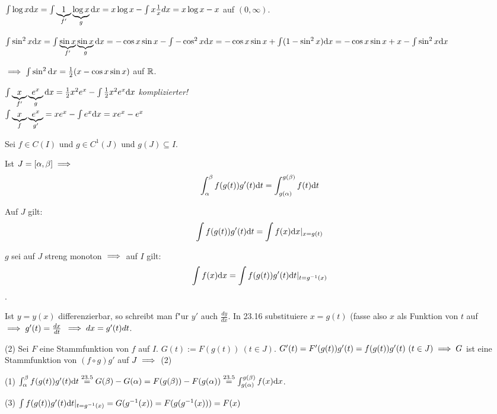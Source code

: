 \documentclass[a4paper,twoside,DIV15,BCOR12mm]{scrbook}
\begin{document}
\begin{beispiele}
\item $\int \log x\text{d}x=\int\underbrace{1}_{f'}\underbrace{\log x}_{g}\text{d}x=x\log x-\int x\frac{1}{x}dx=x\log x - x$ auf $(0, \infty)$.
\item $\int \sin^2 x\text{d}x = \int\underbrace{\sin x}_{f'}\underbrace{\sin x}_{g}\text{d}x = -\cos x\sin x - \int{-\cos^2 x\text{d}x}=-\cos x\sin x + \int(1-\sin^2 x)\text{d}x=-\cos x\sin x + x-\int\sin^2 x\text{d}x$

$\implies \int\sin^2\text{d}x =\frac{1}{2}(x-\cos x \sin x)$ auf $\mathbb{R}$.
\item $\int \underbrace{x}_{f'}\underbrace{e^x}_{g}\text{d}x=\frac{1}{2}x^2e^x-\int\frac{1}{2}x^2e^x\text{d}x$ \emph{komplizierter!}\\
$\int\underbrace{x}_{f}\underbrace{e^x}_{g'}=xe^x-\int{e^x\text{d}x}=xe^x-e^x$
\end{beispiele}

\begin{satz}[Substitutionsregeln]
Sei $f\in C(I)$ und $g \in C^1(J)$ und $g(J)\subseteq I$.
\begin{liste}
\item Ist $J=[\alpha, \beta]\implies$ $$\int_{\alpha}^{\beta}f(g(t))g'(t)\text{d}t=\int_{g(\alpha)}^{g(\beta)}f(t)\text{d}t$$
\item Auf $J$ gilt: $$\int f(g(t))g'(t)\text{d}t=\int f(x)\text{d}x|_{x=g(t)}$$
\item $g$ sei auf $J$ streng monoton $\implies$ auf $I$ gilt: $$\int f(x)\text{d}x=\int f(g(t))g'(t)\text{d}t|_{t=g^{-1}(x)}$$.
\end{liste}
\end{satz}

\begin{merkregel}
Ist $y=y(x)$ differenzierbar, so schreibt man f"ur $y'$ auch $\frac{dy}{dx}$. In 23.16 substituiere $x=g(t)$ (fasse also $x$ als Funktion von $t$ auf $\implies g'(t)=\frac{dx}{dt}$ \glqq$\implies dx=g'(t)dt$\grqq.
\end{merkregel}

\begin{beweise}
\item[(2)]
Sei $F$ eine Stammfunktion von $f$ auf $I$. $G(t):=F(g(t))\ (t\in J)$. $G'(t)=F'(g(t))g'(t)=f(g(t))g'(t)\ (t\in J)\implies G$ ist eine Stammfunktion von $(f\circ g)g'$ auf $J \implies$ (2)
\item[(1)]$\int_{\alpha}^{\beta}f(g(t))g'(t)\text{d}t\overset{23.5}{=}G(\beta)-G(\alpha)=F(g(\beta))-F(g(\alpha))\overset{23.5}{=}\int_{g(\alpha)}^{g(\beta)}f(x)\text{d}x$.
\item[(3)]$\int f(g(t))g'(t)\text{d}t|_{t=g^{-1}(x)}=G(g^{-1}(x))=F(g(g^{-1}(x)))=F(x)$
\end{beweise}
\end{document}
